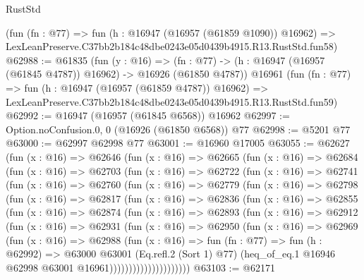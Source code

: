 \begin{lexlean}{RustStd}
\begin{coremodule}
    (fun (fn : @77) =>
    fun (h : @16947 (@16957 (@61859 @1090)) @16962) =>
    LexLeanPreserve.C37bb2b184c48dbe0243e05d0439b4915.R13.RustStd.fun58)
@62988 := @61835
    (fun (y : @16) =>
    (fn : @77) -> (h : @16947 (@16957 (@61845 @4787)) @16962) -> @16926 (@61850 @4787))
    @16961
    (fun (fn : @77) =>
    fun (h : @16947 (@16957 (@61859 @4787)) @16962) =>
    LexLeanPreserve.C37bb2b184c48dbe0243e05d0439b4915.R13.RustStd.fun59)
@62992 := @16947 (@16957 (@61845 @6568)) @16962
@62997 := Option.noConfusion.{0, 0} (@16926 (@61850 @6568)) @77
@62998 := @5201 @77
@63000 := @62997 @62998 @77
@63001 := @16960 @17005
@63055 := @62627
    (fun (x : @16) =>
    @62646
      (fun (x : @16) =>
      @62665
        (fun (x : @16) =>
        @62684
          (fun (x : @16) =>
          @62703
            (fun (x : @16) =>
            @62722
              (fun (x : @16) =>
              @62741
                (fun (x : @16) =>
                @62760
                  (fun (x : @16) =>
                  @62779
                    (fun (x : @16) =>
                    @62798
                      (fun (x : @16) =>
                      @62817
                        (fun (x : @16) =>
                        @62836
                          (fun (x : @16) =>
                          @62855
                            (fun (x : @16) =>
                            @62874
                              (fun (x : @16) =>
                              @62893
                                (fun (x : @16) =>
                                @62912
                                  (fun (x : @16) =>
                                  @62931
                                    (fun (x : @16) =>
                                    @62950
                                      (fun (x : @16) =>
                                      @62969
                                        (fun (x : @16) =>
                                        @62988
                                          (fun (x : @16) =>
                                          fun (fn : @77) =>
                                          fun (h : @62992) =>
                                          @63000
                                            @63001
                                            (Eq.refl.{2} (Sort 1) @77)
                                            (heq_of_eq.{1}
                                              @16946
                                              @62998
                                              @63001
                                              @16961)))))))))))))))))))))
@63103 := @62171

\end{coremodule}
\end{lexlean}
